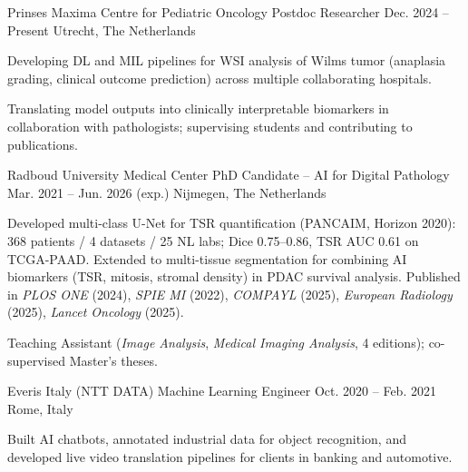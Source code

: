 

\begin{cventries}

\cventry
    {Prinses Maxima Centre for Pediatric Oncology} %
    {Postdoc Researcher} %
    {Dec. 2024 -- Present} %
    {Utrecht, The Netherlands} %
    {
      \begin{cvitems}
        \item {Developing DL and MIL pipelines for WSI analysis of Wilms tumor (anaplasia grading, clinical outcome prediction) across multiple collaborating hospitals.}
        \item {Translating model outputs into clinically interpretable biomarkers in collaboration with pathologists; supervising students and contributing to publications.}
      \end{cvitems}
    }

\cventry
    {Radboud University Medical Center} %
    {PhD Candidate -- AI for Digital Pathology} %
    {Mar. 2021 -- Jun. 2026 (exp.)} %
    {Nijmegen, The Netherlands} %
    {
      \begin{cvitems}
        \item {Developed multi-class U-Net for TSR quantification (PANCAIM, Horizon 2020): 368 patients / 4 datasets / 25 NL labs; Dice 0.75--0.86, TSR AUC 0.61 on TCGA-PAAD. Extended to multi-tissue segmentation for combining AI biomarkers (TSR, mitosis, stromal density) in PDAC survival analysis. Published in \textit{PLOS ONE} (2024), \textit{SPIE MI} (2022), \textit{COMPAYL} (2025), \textit{European Radiology} (2025), \textit{Lancet Oncology} (2025).}
        \item {Teaching Assistant (\textit{Image Analysis}, \textit{Medical Imaging Analysis}, 4 editions); co-supervised Master's theses.}
      \end{cvitems}
    }

\cventry
    {Everis Italy (NTT DATA)} %
    {Machine Learning Engineer} %
    {Oct. 2020 -- Feb. 2021} %
    {Rome, Italy} %
    {
      \begin{cvitems}
        \item {Built AI chatbots, annotated industrial data for object recognition, and developed live video translation pipelines for clients in banking and automotive.}
      \end{cvitems}
    }


\end{cventries}
